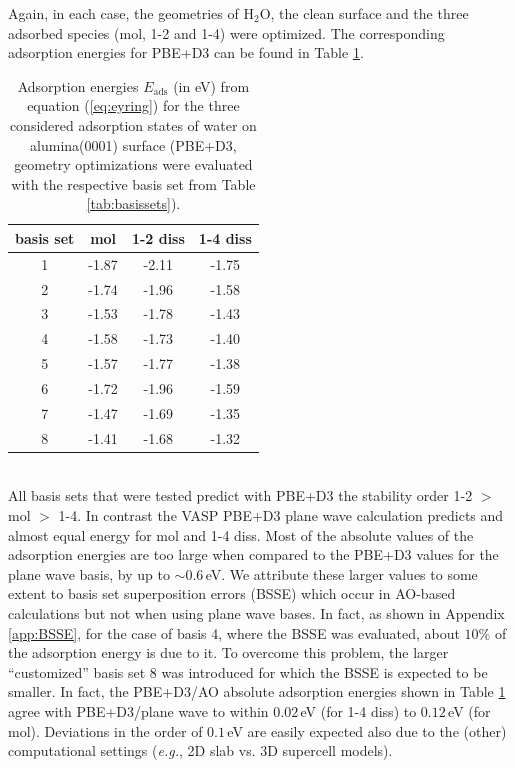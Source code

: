 \documentclass[11pt,DIV=13,BCOR=5mm,a4paper,headinclude]{scrbook}
\begin{document}
Again, in each case, the geometries of H$_2$O, the clean surface and the three adsorbed species (mol, 1-2 and 1-4) were optimized.
The corresponding adsorption energies for PBE+D3 can be found in Table \ref{tab:basisset-results-PBE+D3}.
\begin{table}[!h]
  \centering
   \caption{Adsorption energies $E_\textrm{ads}$ (in eV) from equation (\ref{eq:eyring}) for the three considered adsorption states of water on alumina(0001) surface (PBE+D3, geometry optimizations were evaluated with the respective basis set from Table \ref{tab:basissets}).}
  \begin{tabular}{c|ccc}
  \toprule
  basis set & mol & 1-2 diss & 1-4 diss \\\midrule
  1 &-1.87 &-2.11 &-1.75 \\
  2 &-1.74 &-1.96 &-1.58 \\
  3 &-1.53 &-1.78 &-1.43 \\
  4 &-1.58 &-1.73 &-1.40 \\
  5 &-1.57 &-1.77 &-1.38 \\
  6 &-1.72 &-1.96 &-1.59 \\
  7 &-1.47 &-1.69 &-1.35 \\
  8 &-1.41 &-1.68 &-1.32 \\\bottomrule  
  \end{tabular}
  \label{tab:basisset-results-PBE+D3}
\end{table}
\\

All basis sets that were tested predict with PBE+D3 the stability order 1-2 $>$ mol $>$ 1-4.
In contrast the VASP PBE+D3 plane wave calculation predicts and almost equal energy for mol and 1-4 diss.
Most of the absolute values of the adsorption energies are too large when compared to the PBE+D3 values for the plane wave basis, by up to $\sim0.6\,$eV.
We attribute these larger values to some extent to basis set superposition errors (BSSE) which occur in AO-based calculations but not when using plane wave bases.
In fact, as shown in Appendix \ref{app:BSSE}, for the case of basis 4, where the BSSE was evaluated, about $10\%$ of the adsorption energy is due to it.
To overcome this problem, the larger ``customized'' basis set 8 was introduced for which the BSSE is expected to be smaller.
In fact, the PBE+D3/AO absolute adsorption energies shown in Table \ref{tab:basisset-results-PBE+D3} agree with PBE+D3/plane wave to within $0.02\,$eV (for 1-4 diss) to $0.12\,$eV (for mol).
Deviations in the order of $0.1\,$eV are easily expected also due to the (other) computational settings (\textit{e.g.}, 2D slab vs. 3D supercell models).
\end{document}
